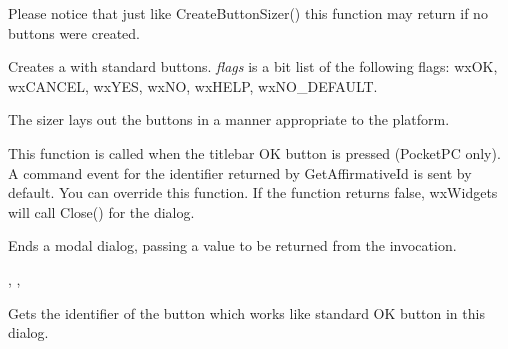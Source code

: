 Please notice that just like CreateButtonSizer() this function may return \NULL 
if no buttons were created.


\label{wxdialogcreatestddialogbuttonsizer}


Creates a  with standard buttons. {\it flags} is a bit list
of the following flags: wxOK, wxCANCEL, wxYES, wxNO, wxHELP, wxNO\_DEFAULT.

The sizer lays out the buttons in a manner appropriate to the platform.


\label{wxdialogdook}


This function is called when the titlebar OK button is pressed (PocketPC only).
A command event for the identifier returned by GetAffirmativeId is sent by
default. You can override this function. If the function returns false, wxWidgets
will call Close() for the dialog.


\label{wxdialogendmodal}


Ends a modal dialog, passing a value to be returned from the \rtfsp
invocation.




,\rtfsp
{},\rtfsp
{}


\label{wxdialoggetaffirmativeid}


Gets the identifier of the button which works like standard OK button in this
dialog.




\label{wxdialoggetescapeid}

